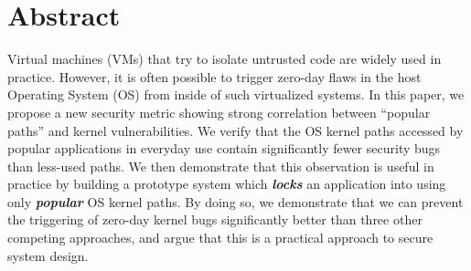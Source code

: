 \section*{Abstract}

%
%

%
%

Virtual machines (VMs) that try to isolate untrusted code are widely used in practice.
However, it is often possible to trigger zero-day flaws
in the host Operating System (OS) from inside of such virtualized systems.
%
In this paper, we propose a new security metric showing strong correlation
between ``popular paths''
and kernel vulnerabilities. We verify that the OS kernel paths accessed
by popular applications in everyday use contain significantly fewer security
bugs than less-used paths. We then demonstrate that this observation is
useful in practice by building a prototype system which \textbf{\textit{locks}}
an application into using only \textbf{\textit{popular}} OS kernel paths.
By doing so, we demonstrate that we can prevent the triggering of zero-day
kernel bugs significantly better than three other competing approaches, and
argue that this is a practical approach to  secure system design.
